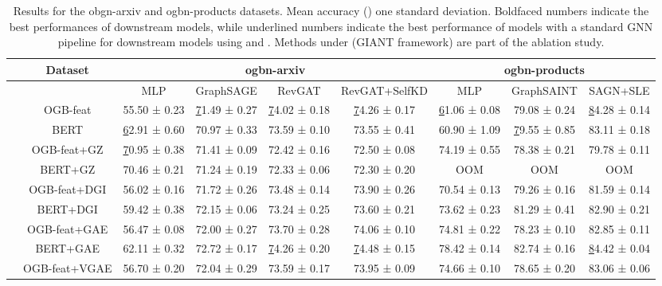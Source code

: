 \documentclass{article} \usepackage{iclr2022_conference,times}
\begin{document}
\begin{table}[t!]
\caption{Results for the obgn-arxiv and ogbn-products datasets. Mean accuracy ()  one standard deviation. Boldfaced numbers indicate the best performances of downstream models, while underlined numbers indicate the best performance of models with a standard GNN pipeline for downstream models using  and . Methods under  (GIANT framework) are part of the ablation study.
}
\vspace{0.1cm}
\centering
\setlength{\tabcolsep}{2.5pt}
\label{tab:ogbn-arxiv}
\scriptsize
\begin{tabular}{@{}cccccc|ccc@{}}
\toprule
\multicolumn{1}{l}{} &
  Dataset &
  \multicolumn{4}{c|}{ogbn-arxiv} &
  \multicolumn{3}{c}{ogbn-products} \\ \midrule
\multicolumn{1}{l}{} &
   &
  MLP &
  GraphSAGE &
  RevGAT &
  RevGAT+SelfKD &
  MLP &
  GraphSAINT &
  SAGN+SLE \\ \midrule
\multirow{2}{*}{} &
  OGB-feat &
  55.50 ± 0.23 &
  {\ul 71.49 ± 0.27 } &
  {\ul 74.02 ± 0.18} &
  {\ul 74.26 ± 0.17} &
  {\ul 61.06 ± 0.08} &
  79.08 ± 0.24 &
  {\ul 84.28 ± 0.14} \\
 &
  BERT &
  {\ul 62.91 ± 0.60} &
  70.97 ± 0.33 &
  73.59 ± 0.10 &
  73.55 ± 0.41 &
  60.90 ± 1.09 &
  {\ul 79.55 ± 0.85} &
  83.11 ± 0.18 \\ \midrule
\multirow{8}{*}{} &
  OGB-feat+GZ &
  {\ul 70.95 ± 0.38} &
  71.41 ± 0.09 &
  72.42 ± 0.16 &
  72.50 ± 0.08 &
  74.19 ± 0.55 &
  78.38 ± 0.21 &
  79.78 ± 0.11 \\
 &
  BERT+GZ &
  70.46 ± 0.21 &
  71.24 ± 0.19 &
  72.33 ± 0.06 &
  72.30 ± 0.20 &
  OOM &
  OOM &
  OOM \\
 &
  OGB-feat+DGI &
  56.02 ± 0.16 &
  71.72 ± 0.26 &
  73.48 ± 0.14 &
  73.90 ± 0.26 &
  70.54 ± 0.13 &
  79.26 ± 0.16 &
  81.59 ± 0.14 \\
 &
  BERT+DGI &
  59.42 ± 0.38 &
  72.15 ± 0.06 &
  73.24 ± 0.25 &
  73.60 ± 0.21 &
  73.62 ± 0.23 &
  81.29 ± 0.41 &
  82.90 ± 0.21 \\
 &
  OGB-feat+GAE &
  56.47 ± 0.08 &
  72.00 ± 0.27 &
  73.70 ± 0.28 &
  74.06 ± 0.10 &
  74.81 ± 0.22 &
  78.23 ± 0.10 &
  82.85 ± 0.11 \\
 &
  BERT+GAE &
  62.11 ± 0.32 &
  72.72 ± 0.17 &
  {\ul 74.26 ± 0.20} &
  {\ul 74.48 ± 0.15} &
  78.42 ± 0.14 &
  82.74 ± 0.16 &
  {\ul 84.42 ± 0.04} \\
 &
  OGB-feat+VGAE &
  56.70 ± 0.20 &
  72.04 ± 0.29 &
  73.59 ± 0.17 &
  73.95 ± 0.09 &
  74.66 ± 0.10 &
  78.65 ± 0.20 &
  83.06 ± 0.06 \\

\end{tabular}
\end{table}
\end{document}
